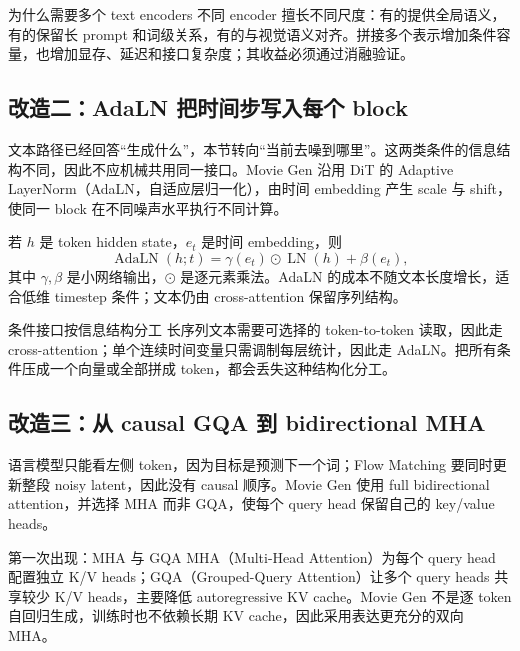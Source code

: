 \begin{knowledgebox}{为什么需要多个 text encoders}
不同 encoder 擅长不同尺度：有的提供全局语义，有的保留长 prompt 和词级关系，有的与视觉语义对齐。拼接多个表示增加条件容量，也增加显存、延迟和接口复杂度；其收益必须通过消融验证。
\end{knowledgebox}

\subsection{改造二：AdaLN 把时间步写入每个 block}

文本路径已经回答“生成什么”，本节转向“当前去噪到哪里”。这两类条件的信息结构不同，因此不应机械共用同一接口。Movie Gen 沿用 DiT 的 Adaptive LayerNorm（AdaLN，自适应层归一化），由时间 embedding 产生 scale 与 shift，使同一 block 在不同噪声水平执行不同计算。


若 $h$ 是 token hidden state，$e_t$ 是时间 embedding，则
\[
\operatorname{AdaLN}(h;t)
=\gamma(e_t)\odot\operatorname{LN}(h)+\beta(e_t),
\]
其中 $\gamma,\beta$ 是小网络输出，$\odot$ 是逐元素乘法。AdaLN 的成本不随文本长度增长，适合低维 timestep 条件；文本仍由 cross-attention 保留序列结构。

\begin{importantbox}{条件接口按信息结构分工}
长序列文本需要可选择的 token-to-token 读取，因此走 cross-attention；单个连续时间变量只需调制每层统计，因此走 AdaLN。把所有条件压成一个向量或全部拼成 token，都会丢失这种结构化分工。
\end{importantbox}

\subsection{改造三：从 causal GQA 到 bidirectional MHA}

语言模型只能看左侧 token，因为目标是预测下一个词；Flow Matching 要同时更新整段 noisy latent，因此没有 causal 顺序。Movie Gen 使用 full bidirectional attention，并选择 MHA 而非 GQA，使每个 query head 保留自己的 key/value heads。


\begin{knowledgebox}{第一次出现：MHA 与 GQA}
MHA（Multi-Head Attention）为每个 query head 配置独立 K/V heads；GQA（Grouped-Query Attention）让多个 query heads 共享较少 K/V heads，主要降低 autoregressive KV cache。Movie Gen 不是逐 token 自回归生成，训练时也不依赖长期 KV cache，因此采用表达更充分的双向 MHA。
\end{knowledgebox}

